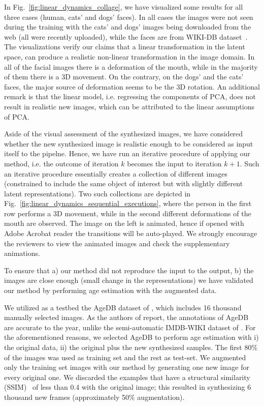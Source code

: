 \documentclass[10pt,twocolumn,letterpaper]{article}
\begin{document}
In Fig.~\ref{fig:linear_dynamics_collage}, we have visualized some results for all three cases (human, cats' and dogs' faces). In all cases the images were not seen during the training with the cats' and dogs' images being downloaded from the web (all were recently uploaded), while the faces are from WIKI-DB dataset~\cite{rothe2016deep}. The visualizations verify our claims that a linear transformation in the latent space, can produce a realistic non-linear transformation in the image domain. In all of the facial images there is a deformation of the mouth, while in the majority of them there is a 3D movement. On the contrary, on the dogs' and the cats' faces, the major source of deformation seems to be the 3D rotation. An additional remark is that the linear model, i.e. regressing the components of PCA, does not result in realistic new images, which can be attributed to the linear assumptions of PCA. 

Aside of the visual assessment of the synthesized images, we have considered whether the new synthesized image is realistic enough to be considered as input itself to the pipelne. Hence, we have run an iterative procedure of applying our method, i.e. the outcome of iteration $k$ becomes the input to iteration $k + 1$. Such an iterative procedure essentially creates a collection of different images (constrained to include the same object of interest but with slightly different latent representations). Two such collections are depicted in Fig.~\ref{fig:linear_dynamics_sequential_executions}, where the person in the first row performs a 3D movement, while in the second different deformations of the mouth are observed. The image on the left is animated, hence if opened with Adobe Acrobat reader the transitions will be auto-played. We strongly encourage the reviewers to view the animated images and check the supplementary animations.

To ensure that a) our method did not reproduce the input to the output, b) the images are close enough (small change in the representations) we have validated our method by performing age estimation with the augmented data. 

We utilized as a testbed the AgeDB dataset of \cite{moschoglou2017agedb}, which includes 16 thousand manually selected images. As the authors of \cite{moschoglou2017agedb} report, the annotations of AgeDB are accurate to the year, unlike the semi-automatic IMDB-WIKI dataset of \cite{rothe2016deep}. For the aforementioned reasons, we selected AgeDB to perform age estimation with i) the original data, ii) the original plus the new synthesized samples. The first 80\% of the images was used as training set and the rest as test-set. We augmented only the training set images with our method by generating one new image for every original one. We discarded the examples that have a structural similarity (SSIM)~\cite{wang2004image} of less than 0.4 with the original image; this resulted in synthesizing 6 thousand new frames (approximately 50\% augmentation). 
\end{document}
